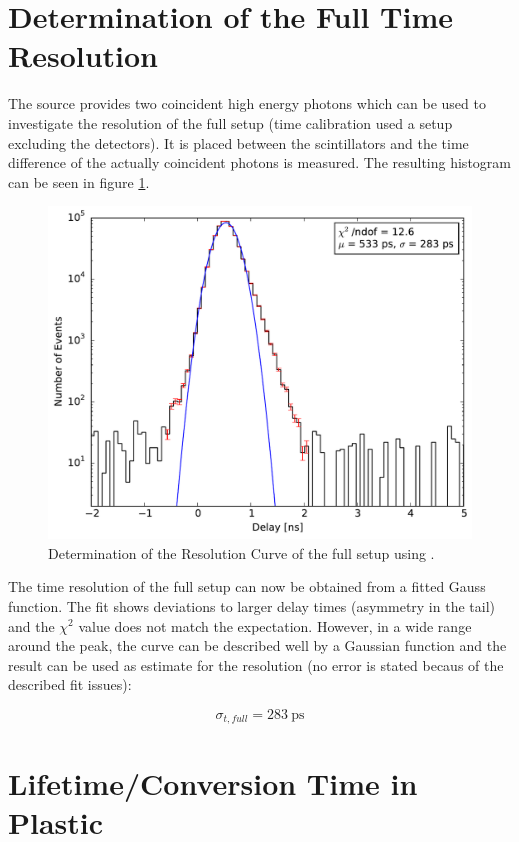 \documentclass[
	paper=A4,
	parskip=full,
	chapterprefix=true,
	11pt,
	headings=normal,
	bibliography=totoc,
	listof=totoc,
	titlepage=on,
]{scrreprt}
\begin{document}
\section{Determination of the Full Time Resolution}
The  source provides two coincident high energy photons which can be used to investigate the resolution of the full setup (time calibration used a setup excluding the detectors). It is placed between the scintillators and the time difference of the actually coincident photons is measured. The resulting histogram can be seen in figure \ref{fig:resolution_peak}. 

\begin{figure}
	\centering
	\includegraphics{resolution_peak}
	\caption{Determination of the Resolution Curve of the full setup using .}
	\label{fig:resolution_peak}
\end{figure}

The time resolution of the full setup can now be obtained from a fitted Gauss function. The fit shows deviations to larger delay times (asymmetry in the tail) and the $\chi^2$ value does not match the expectation. However, in a wide range around the peak, the curve can be described well by a Gaussian function and the result can be used as estimate for the resolution (no error is stated becaus of the described fit issues):

\begin{equation}
	\sigma_{t,full}=\SI{283}{\pico\second}
\end{equation}

\section{Lifetime/Conversion Time in Plastic}
\end{document}
